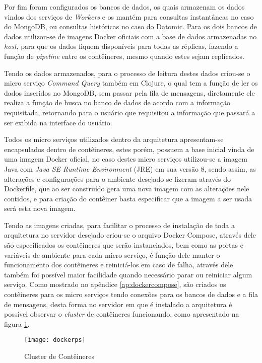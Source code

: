Por fim foram configurados os bancos de dados, os quais armazenam os dados vindos dos serviços de \textit{Workers} e os mantém para consultas instantâneas no caso do MongoDB, ou consultas históricas no caso do Datomic. Para os dois bancos de dados utilizou-se de imagens Docker oficiais com a base de dados armazenadas no \textit{host}, para que os dados fiquem disponíveis para todas as réplicas, fazendo a função de \textit{pipeline} entre os contêineres, mesmo quando estes sejam replicados.

Tendo os dados armazenados, para o processo de leitura destes dados criou-se o micro serviço \textit{Command Query} também em Clojure, o qual tem a função de ler os dados inseridos no MongoDB, sem passar pela fila de mensagens, diretamente ele realiza a função de busca no banco de dados de acordo com a informação requisitada, retornando para o usuário que requisitou a informação que passará a ser exibida na interface do usuário.

Todos os micro serviços  utilizados dentro da arquitetura apresentam-se encapsulados dentro de contêineres, estes porém, possuem a base inicial vinda de uma imagem Docker oficial, no caso destes micro serviços utilizou-se a imagem Java com \textit{Java SE Runtime Environment} (JRE) em sua versão 8, sendo assim, as alterações e configurações para o ambiente desejado se fizeram através do Dockerfile, que ao ser construído gera uma nova imagem com as alterações nele contidos, e para criação do contêiner basta especificar que a imagem a ser usada será esta nova imagem.

Tendo as imagens criadas, para facilitar o processo de instalação de toda a arquitetura no servidor desejado criou-se o arquivo Docker Compose, através dele são especificados os contêineres que serão instanciados, bem como as portas e variáveis de ambiente para cada micro serviço, é função  dele manter o funcionamento dos contêineres e reiniciá-los em caso de falha, através dele também foi possível maior facilidade quando necessário parar ou reiniciar algum serviço. Como mostrado no apêndice \ref{ap:dockercompose}, são criados os contêineres para os micro serviços tendo conexões para os bancos de dados e a fila de mensagens, desta forma no servidor em que é instalado a arquitetura é possível observar o  \textit{cluster} de contêineres funcionando, como apresentado na figura \ref{fig:dockerps}.

\begin{figure}[!h]
\caption{\label{fig:dockerps} Cluster de Contêineres}
\begin{center}
\texttt{[image: dockerps]}
\end{center}
\end{figure}


